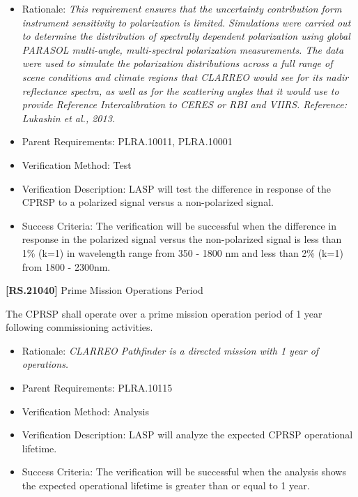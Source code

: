 \documentclass[12pt,oneside,oldfontcommands]{memoir}
\begin{document}
\begin{itemize}
\item{} Rationale: \emph{This requirement ensures that the uncertainty contribution form instrument sensitivity to polarization is limited. Simulations were carried out to determine the distribution of spectrally dependent polarization using global PARASOL multi-angle, multi-spectral polarization measurements. The data were used to simulate the polarization distributions across a full range of scene conditions and climate regions that CLARREO would see for its nadir reflectance spectra, as well as for the scattering angles that it would use to provide Reference Intercalibration to CERES or RBI and VIIRS. Reference: Lukashin et al., 2013.}

\item{} Parent Requirements: PLRA.10011, PLRA.10001

\item{} Verification Method: Test

\item{} Verification Description: \gls{LASP} will \gls{test} the difference in response of the \gls{CPRSP} to a polarized signal versus a non-polarized signal.

\item{} Success Criteria: The verification will be successful when the difference in response in the polarized signal versus the non-polarized signal is less than 1\% (k=1) in wavelength range from 350 - 1800 nm and less than 2\% (k=1) from 1800 - 2300nm.

\end{itemize}

\textbf{[RS.21040]} Prime Mission Operations Period

The \gls{CPRSP} shall operate over a prime mission operation period of 1 year following commissioning activities.

\begin{itemize}
\item{} Rationale: \emph{CLARREO Pathfinder is a directed mission with 1 year of operations.}

\item{} Parent Requirements: PLRA.10115

\item{} Verification Method: Analysis

\item{} Verification Description: \gls{LASP} will analyze the expected \gls{CPRSP} operational lifetime.

\item{} Success Criteria: The verification will be successful when the \gls{analysis} shows the expected operational lifetime is greater than or equal to 1 year.

\end{itemize}
\end{document}
